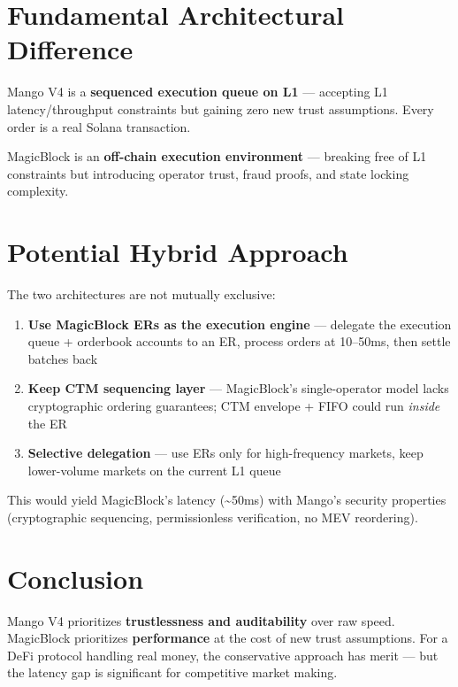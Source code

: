 \documentclass[11pt]{article}
\begin{document}
\section{Fundamental Architectural Difference}

Mango V4 is a \textbf{sequenced execution queue on L1} --- accepting L1 latency/throughput constraints but gaining zero new trust assumptions. Every order is a real Solana transaction.

MagicBlock is an \textbf{off-chain execution environment} --- breaking free of L1 constraints but introducing operator trust, fraud proofs, and state locking complexity.

\section{Potential Hybrid Approach}

The two architectures are not mutually exclusive:

\begin{enumerate}
  \item \textbf{Use MagicBlock ERs as the execution engine} --- delegate the execution queue + orderbook accounts to an ER, process orders at 10--50ms, then settle batches back
  \item \textbf{Keep CTM sequencing layer} --- MagicBlock's single-operator model lacks cryptographic ordering guarantees; CTM envelope + FIFO could run \emph{inside} the ER
  \item \textbf{Selective delegation} --- use ERs only for high-frequency markets, keep lower-volume markets on the current L1 queue
\end{enumerate}

This would yield MagicBlock's latency (\textasciitilde50ms) with Mango's security properties (cryptographic sequencing, permissionless verification, no MEV reordering).

\section{Conclusion}

Mango V4 prioritizes \textbf{trustlessness and auditability} over raw speed. MagicBlock prioritizes \textbf{performance} at the cost of new trust assumptions. For a DeFi protocol handling real money, the conservative approach has merit --- but the latency gap is significant for competitive market making.
\end{document}
